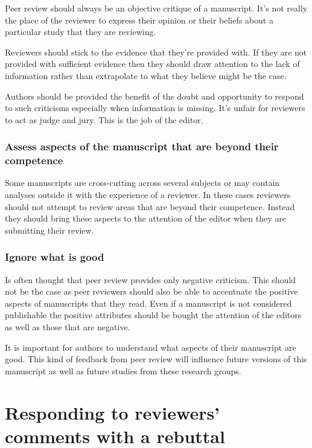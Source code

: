\documentclass[
]{krantz}
\begin{document}
Peer review should always be an objective critique of a manuscript. It's not really the place of the reviewer to express their opinion or their beliefs about a particular study that they are reviewing.

Reviewers should stick to the evidence that they're provided with. If they are not provided with sufficient evidence then they should draw attention to the lack of information rather than extrapolate to what they believe might be the case.

Authors should be provided the benefit of the doubt and opportunity to respond to such criticisms especially when information is missing. It's unfair for reviewers to act as judge and jury. This is the job of the editor.

\hypertarget{assess-aspects-of-the-manuscript-that-are-beyond-their-competence}{%
\subsection{Assess aspects of the manuscript that are beyond their competence}\label{assess-aspects-of-the-manuscript-that-are-beyond-their-competence}}

Some manuscripts are cross-cutting across several subjects or may contain analyses outside it with the experience of a reviewer. In these cases reviewers should not attempt to review areas that are beyond their competence. Instead they should bring these aspects to the attention of the editor when they are submitting their review.

\hypertarget{ignore-what-is-good}{%
\subsection{Ignore what is good}\label{ignore-what-is-good}}

Is often thought that peer review provides only negative criticism. This should not be the case as peer reviewers should also be able to accentuate the positive aspects of manuscripts that they read. Even if a manuscript is not considered publishable the positive attributes should be bought the attention of the editors as well as those that are negative.

It is important for authors to understand what aspects of their manuscript are good. This kind of feedback from peer review will influence future versions of this manuscript as well as future studies from these research groups.

\hypertarget{rebuttal}{%
\chapter{Responding to reviewers' comments with a rebuttal}\label{rebuttal}}
\end{document}
